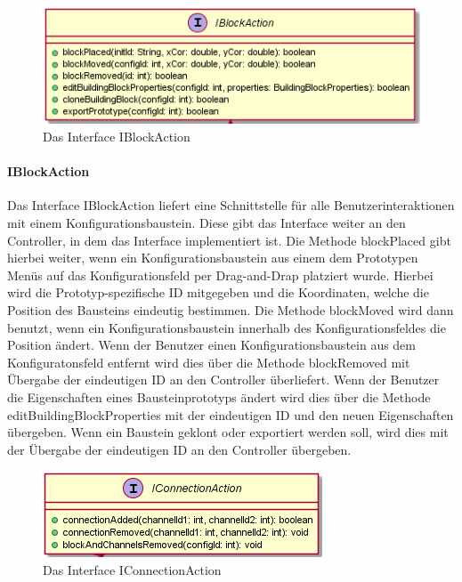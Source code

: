\documentclass[parskip=full]{scrartcl}
\begin{document}
\begin{figure}[htbp]
	\begin{center}
		\includegraphics[width = 10 cm]{Grafiken/View/IBlockAction.png}
		\caption{Das Interface IBlockAction}
		\label{IBlockAction}
	\end{center}
\end{figure}

\paragraph{IBlockAction}

Das Interface IBlockAction liefert eine Schnittstelle für alle Benutzerinteraktionen mit einem Konfigurationsbaustein. Diese gibt das Interface weiter an den Controller, in dem das Interface implementiert ist. Die Methode blockPlaced gibt hierbei weiter, wenn ein Konfigurationsbaustein aus einem dem Prototypen Menüs auf das Konfigurationsfeld per Drag-and-Drap platziert wurde. Hierbei wird die Prototyp-spezifische ID mitgegeben und die Koordinaten, welche die Position des Bausteins eindeutig bestimmen. Die Methode blockMoved wird dann benutzt, wenn ein Konfigurationsbaustein innerhalb des Konfigurationsfeldes die Position ändert. Wenn der Benutzer einen Konfigurationsbaustein aus dem Konfiguratonsfeld entfernt wird dies über die Methode blockRemoved mit Übergabe der eindeutigen ID an den Controller überliefert. Wenn der Benutzer die Eigenschaften eines Bausteinprototyps ändert wird dies über die Methode editBuildingBlockProperties mit der eindeutigen ID und den neuen Eigenschaften übergeben. Wenn ein Baustein geklont oder exportiert werden soll, wird dies mit der Übergabe der eindeutigen ID an den Controller übergeben.

\begin{figure}[htbp]
	\begin{center}
		\includegraphics[width = 9 cm]{Grafiken/View/IConnectionAction.png}
		\caption{Das Interface IConnectionAction}
		\label{IConnectionAction}
	\end{center}
\end{figure}
\end{document}

